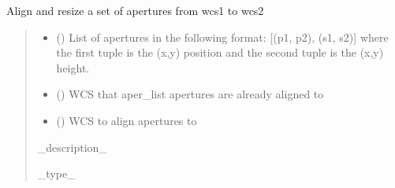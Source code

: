 \documentclass[letterpaper,10pt,english]{sphinxmanual}
\begin{document}
\begin{fulllineitems}
\label{\detokenize{spectra:cubespa.spectra.align_apertures}}
\pysigstartsignatures
{}
\pysigstopsignatures
\sphinxAtStartPar
Align and resize a set of apertures from wcs1 to wcs2
\begin{quote}\begin{description}
\begin{itemize}
\item {} 
\sphinxAtStartPar
{} () \textendash{} List of apertures in the following format:
{[}(p1, p2), (s1, s2){]} where the first tuple is the (x,y) position and the second tuple is the (x,y) height.

\item {} 
\sphinxAtStartPar
{} () \textendash{} WCS that aper\_list apertures are already aligned to

\item {} 
\sphinxAtStartPar
{} () \textendash{} WCS to align apertures to

\end{itemize}

\sphinxAtStartPar
\_description\_

\sphinxAtStartPar
\_type\_

\end{description}\end{quote}

\end{fulllineitems}


\begin{fulllineitems}
\label{\detokenize{spectra:cubespa.spectra.analyze_spectra}}
\pysigstartsignatures
{}
\pysigstopsignatures
\end{fulllineitems}
\end{document}
